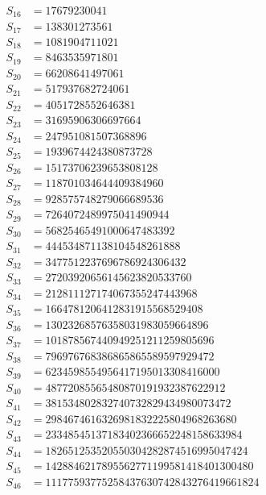 \begin{align*}
S_{16} &= 17679230041\\
S_{17} &= 138301273561\\
S_{18} &= 1081904711021\\
S_{19} &= 8463535971801\\
S_{20} &= 66208641497061\\
S_{21} &= 517937682724061\\
S_{22} &= 4051728552646381\\
S_{23} &= 31695906306697664\\
S_{24} &= 247951081507368896\\
S_{25} &= 1939674424380873728\\
S_{26} &= 15173706239653808128\\
S_{27} &= 118701034644409384960\\
S_{28} &= 928575748279066689536\\
S_{29} &= 7264072489975041490944\\
S_{30} &= 56825465491000647483392\\
S_{31} &= 444534871138104548261888\\
S_{32} &= 3477512237696786924306432\\
S_{33} &= 27203920656145623820533760\\
S_{34} &= 212811127174067355247443968\\
S_{35} &= 1664781206412831915568529408\\
S_{36} &= 13023268576358031983059664896\\
S_{37} &= 101878567440949251211259805696\\
S_{38} &= 796976768386865865589597929472\\
S_{39} &= 6234598554956417195013308416000\\
S_{40} &= 48772085565480870191932387622912\\
S_{41} &= 381534802832740732829434980073472\\
S_{42} &= 2984674616326981832225804968263680\\
S_{43} &= 23348545137183402366652248158633984\\
S_{44} &= 182651253520550304282874516995047424\\
S_{45} &= 1428846217895562771199581418401300480\\
S_{46} &= 11177593775258437630742843276419661824\\
\end{align*}	
